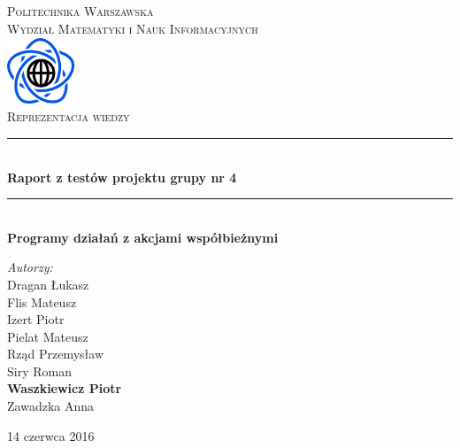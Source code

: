 \documentclass{article}
\begin{document}
	
\begin{titlepage}

\newcommand{\HRule}{\rule{\linewidth}{0.5mm}}
\newcommand{\Action}[1]{\textsc{#1}}

\center


\textsc{\LARGE Politechnika Warszawska}\\[0.3cm]
\textsc{\Large Wydział Matematyki i Nauk Informacyjnych}\\[0.6cm]

\includegraphics[width=2cm, height=2cm]{logo}\\[0.6cm]


\textsc{\Huge Reprezentacja wiedzy}\\[0.3cm]


\HRule \\[0.4cm]
{ \LARGE \bfseries Raport z testów projektu grupy nr 4}\\[0.1cm]
 

\HRule \\[0.4cm]
{  \bfseries Programy działań z akcjami współbieżnymi}\\[1.2cm]

\begin{flushright}
\Large \emph{Autorzy:}\\[0.5cm]
Dragan Łukasz\\
Flis Mateusz\\
Izert Piotr\\
Pielat Mateusz\\
Rząd Przemysław\\
Siry Roman\\
\textbf{Waszkiewicz Piotr}\\
Zawadzka Anna\\[0.9cm]

\end{flushright}

\vfill
{\large 14 czerwca 2016}\\[1cm]
	


\end{titlepage}
	
\end{document}
